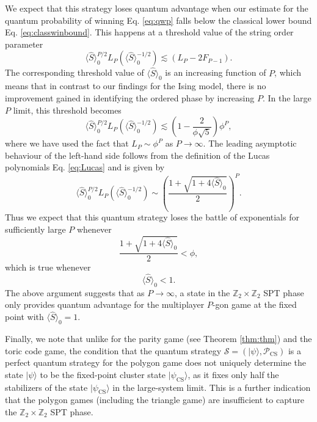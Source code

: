 \documentclass[prb,twocolumn,showpacs,amssymb,superscriptaddress]{revtex4-2}
\begin{document}
We expect that this strategy loses quantum advantage when our estimate for the quantum probability of winning Eq. \eqref{eq:qwp} falls below the classical lower bound Eq. \eqref{eq:classwinbound}. This happens at a threshold value of the string order parameter
\begin{equation}
\langle \hat{S} \rangle_0^{P/2}L_P (\langle \hat{S}\rangle_0^{-1/2}) \lesssim \left( L_P -  2 F_{P-1}\right).
\end{equation}
The corresponding threshold value of $\langle \hat{S} \rangle_0$ is an increasing function of $P$, which means that in contrast to our findings for the Ising model, there is no improvement gained in identifying the ordered phase by increasing $P$. In the large $P$ limit, this threshold becomes
\begin{equation}
\langle \hat{S} \rangle_0^{P/2}L_P (\langle \hat{S}\rangle_0^{-1/2}) \lesssim \left(1-\frac{2}{\phi \sqrt{5}}\right)\phi^P,
\end{equation}
where we have used the fact that $L_P \sim \phi^P$ as $P \to \infty$. The leading asymptotic behaviour of the left-hand side follows from the definition of the Lucas polynomials Eq. \eqref{eq:Lucas} and is given by
\begin{equation}
\langle \hat{S} \rangle_0^{P/2}L_P (\langle \hat{S}\rangle_0^{-1/2}) \sim \left(\frac{1 + \sqrt{1+4\langle \hat{S} \rangle_0}}{2}\right)^P.
\end{equation}
Thus we expect that this quantum strategy loses the battle of exponentials for sufficiently large $P$ whenever
\begin{equation}
\frac{1+\sqrt{1+4\langle \hat{S}\rangle_0}}{2} < \phi,
\end{equation}
which is true whenever
\begin{equation}
\langle \hat{S} \rangle_0 < 1.
\end{equation}
The above argument suggests that as $P \to \infty$, a state in the $\mathbb{Z}_2 \times \mathbb{Z}_2$ SPT phase only provides quantum advantage for the multiplayer $P$-gon game at the fixed point with $\langle \hat{S} \rangle_0 = 1$.

Finally, we note that unlike for the parity game (see Theorem \ref{thm:thm}) and the toric code game\cite{companion}, the condition that the quantum strategy $\mathcal{S} = (|\psi\rangle,\mathcal{P}_{\mathrm{CS}})$ is a perfect quantum strategy for the polygon game does not uniquely determine the state $|\psi\rangle$ to be the fixed-point cluster state $|\psi_{\mathrm{CS}}\rangle$, as it fixes only half the stabilizers of the state $|\psi_{\mathrm{CS}}\rangle$ in the large-system limit. This is a further indication that the polygon games (including the triangle game) are insufficient to capture the $\mathbb{Z}_2 \times \mathbb{Z}_2$ SPT phase.
\end{document}
